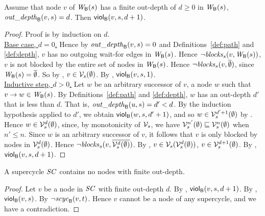 \begin{proposition} \label{prop:outdepth-finite-implies-scViol}
Assume that node $v$ of $\wfg{\B}{s}$ has a finite out-depth of $d \ge 0$ in $\wfg{\B}{s}$, \ie 
$\wodepth{\B}{v}{s} = d$. Then $\viol{v}{d+1}{s}$. 
\end{proposition}
%
\begin{proof}
Proof is by induction on $d$.\\

\noindent
\ul{Base case, $d=0$.} Hence by $\wodepth{\B}{v}{s} = 0$ and Definitions~\ref{def:path} and \ref{def:depth},  
$v$ has no outgoing wait-for edges in $\wfg{\B}{s}$. Hence $\neg \blocks{s}{v}{\wfg{\B}{s}}$, \ie $v$ is not blocked by the entire set of nodes in 
$\wfg{\B}{s}$. Hence $\neg \blocks{s}{v}{\compl{\ewfg}}$, since $\wfg{\B}{s} = \compl{\ewfg}$. So by , 
$v \in \VFs{s}{\ewfg}$. By , $\scVd{v}{1}{s}$.\\

\noindent
\ul{Inductive step, $d > 0$.}
Let $w$ be an arbitrary successor of $v$, \ie a node $w$ such that $v \ar w \in \wfg{\B}{s}$.
By Definitions~\ref{def:path} and \ref{def:depth}, $w$ has an out-depth $d'$ that is less than $d$. 
That is, $\wodepth{\B}{u}{s} = d' < d$.
By the induction hypothesis applied to $d'$, we obtain $\viol{w}{d'+1}{s}$, and so $w \in \VFsi{s}{\ewfg}{d'+1}$ by .
Hence $w \in \VFsi{s}{\ewfg}{d}$, since, by monotonicity of $\VFsymb_s$, we have 
$ \VFsi{s}{\ewfg}{n'} \subg  \VFsi{s}{\ewfg}{n}$ when $n' \le n$.
Since  $w$ is an arbitrary successor of $v$, it follows that $v$ is only blocked by nodes in $\VFsi{s}{\ewfg}{d}$.
Hence $\neg \blocks{s}{v}{\compl{ \VFsi{s}{\ewfg}{d} } }$.
By , $v \in \VFs{s}{\VFsi{s}{\ewfg}{d}}$, \ie $v \in  \VFsi{s}{\ewfg}{d+1}$.
By , $\scVd{v}{d+1}{s}$.
\end{proof}




\begin{corollary} 
\label{cor:supercycle:no-finite-outdepth}
A supercycle $\SC$ contains no nodes with finite out-depth.
\end{corollary}
%
\begin{proof} 
Let $v$ be a node in $\SC$ with finite out-depth $d$.
By , $\scVd{v}{d+1}{s}$.
By , $\scV{v}{s}$.
By  $\neg \scyc{\B}{t}{v}$. Hence $v$ cannot be a node of any supercycle, and we have a contradiction.
\end{proof}








